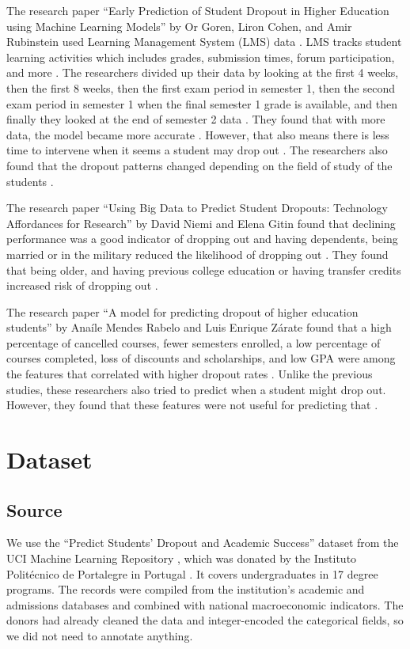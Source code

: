 \documentclass[11pt]{article}
\begin{document}
The research paper “Early Prediction of Student Dropout in Higher Education using Machine Learning Models” by Or Goren, Liron Cohen, and Amir Rubinstein used Learning Management System (LMS) data \citep{goren2024}. LMS tracks student learning activities which includes grades, submission times, forum participation, and more \citep{goren2024}. The researchers divided up their data by looking at the first 4 weeks, then the first 8 weeks, then the first exam period in semester 1, then the second exam period in semester 1 when the final semester 1 grade is available, and then finally they looked at the end of semester 2 data \citep{goren2024}. They found that with more data, the model became more accurate \citep{goren2024}. However, that also means there is less time to intervene when it seems a student may drop out \citep{goren2024}. The researchers also found that the dropout patterns changed depending on the field of study of the students \citep{goren2024}. 

The research paper “Using Big Data to Predict Student Dropouts: Technology Affordances for Research” by David Niemi and Elena Gitin found that declining performance was a good indicator of dropping out and having dependents, being married or in the military reduced the likelihood of dropping out \citep{niemi2012}. They found that being older, and having previous college education or having transfer credits increased risk of dropping out \citep{niemi2012}. 

The research paper “A model for predicting dropout of higher education students” by Anaíle Mendes Rabelo and Luis Enrique Zárate found that a high percentage of cancelled courses, fewer semesters enrolled, a low percentage of courses completed, loss of discounts and scholarships, and low GPA were among the features that correlated with higher dropout rates \citep{rabelo2025}. Unlike the previous studies, these researchers also tried to predict when a student might drop out. However, they found that these features were not useful for predicting that \citep{rabelo2025}.

\section{Dataset}\label{sec:dataset}

\subsection{Source}

We use the ``Predict Students' Dropout and Academic Success'' dataset from the UCI Machine Learning Repository \citep{realinho2021uci}, which was donated by the Instituto Polit\'{e}cnico de Portalegre in Portugal \citep{realinho2022data}.
It covers undergraduates in 17 degree programs.
The records were compiled from the institution's academic and admissions databases and combined with national macroeconomic indicators.
The donors had already cleaned the data and integer-encoded the categorical fields, so we did not need to annotate anything.
\end{document}
